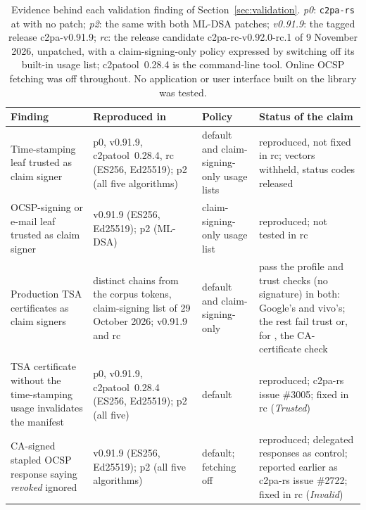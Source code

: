 \documentclass[acmsmall,screen,nonacm]{acmart}
\begin{document}
\begin{table}[h]
\caption{Evidence behind each validation finding of Section~\ref{sec:validation}.
\emph{p0}: \texttt{c2pa-rs} at \texttt{\NvalCommit} with no patch; \emph{p2}:
the same with both ML-DSA patches; \emph{v0.91.9}: the tagged release
c2pa-v0.91.9; \emph{rc}: the release candidate c2pa-rc-v0.92.0-rc.1 of
9 November 2026, unpatched, with a claim-signing-only policy expressed by
switching off its built-in usage list; c2patool~0.28.4 is the command-line
tool. Online OCSP fetching was off
throughout. No application or user interface built on the library was tested.}
\label{tab:evidence}
\footnotesize
\begin{tabular}{>{\raggedright\arraybackslash}p{3.2cm}>{\raggedright\arraybackslash}p{3.3cm}>{\raggedright\arraybackslash}p{2.3cm}>{\raggedright\arraybackslash}p{3.4cm}}
\toprule
Finding & Reproduced in & Policy & Status of the claim\\
\midrule
Time-stamping leaf trusted as claim signer & p0, v0.91.9, c2patool~0.28.4, rc (ES256, Ed25519); p2 (all five algorithms) & default and claim-signing-only usage lists & reproduced, not fixed in rc; vectors withheld, status codes released\\
OCSP-signing or e-mail leaf trusted as claim signer & v0.91.9 (ES256, Ed25519); p2 (ML-DSA) & claim-signing-only usage list & reproduced; not tested in rc\\
Production TSA certificates as claim signers & \NtpcChains{} distinct chains from the corpus tokens, claim-signing list of 29 October 2026; v0.91.9 and rc & default and claim-signing-only & \NtpcStrong{} pass the profile and trust checks (no signature) in both: Google's \NtpcGoogle{} and vivo's; the rest fail trust or, for \NtpcCaRej{}, the CA-certificate check\\
TSA certificate without the time-stamping usage invalidates the manifest & p0, v0.91.9, c2patool~0.28.4 (ES256, Ed25519); p2 (all five) & default & reproduced; c2pa-rs issue \#3005; fixed in rc (\emph{Trusted})\\
CA-signed stapled OCSP response saying \emph{revoked} ignored & v0.91.9 (ES256, Ed25519); p2 (all five algorithms) & default; fetching off & reproduced; delegated responses as control; reported earlier as c2pa-rs issue \#2722; fixed in rc (\emph{Invalid})\\
\bottomrule
\end{tabular}
\end{table}


\end{document}
